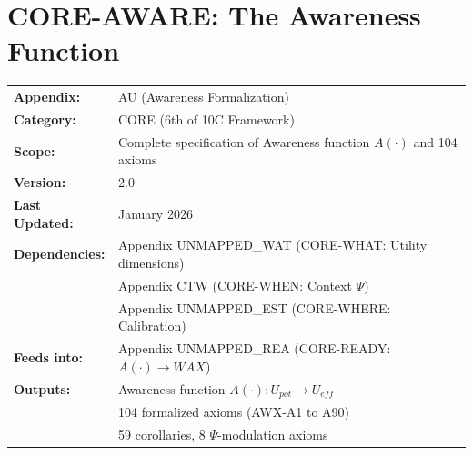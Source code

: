 %

\chapter{CORE-AWARE: The Awareness Function}
\label{app:core-aware}
\label{app:bcm-axiom-formalization}  %


\begin{tcolorbox}[colback=blue!5!white, colframe=blue!75!black,
    title=\textbf{Appendix UNMAPPED_AWA: CORE-AWARE}]

\begin{tabular}{@{}ll@{}}
\textbf{Appendix:} & AU (Awareness Formalization) \\
\textbf{Category:} & CORE (6th of 10C Framework) \\
\textbf{Scope:} & Complete specification of Awareness function $A(\cdot)$ and 104 axioms \\
\textbf{Version:} & 2.0 \\
\textbf{Last Updated:} & January 2026 \\
\textbf{Dependencies:} & Appendix UNMAPPED_WAT (CORE-WHAT: Utility dimensions) \\
                       & Appendix CTW (CORE-WHEN: Context $\Psi$) \\
                       & Appendix UNMAPPED_EST (CORE-WHERE: Calibration) \\
\textbf{Feeds into:}   & Appendix UNMAPPED_REA (CORE-READY: $A(\cdot) \to WAX$) \\
\textbf{Outputs:} & Awareness function $A(\cdot): U_{pot} \to U_{eff}$ \\
                  & 104 formalized axioms (AWX-A1 to A90) \\
                  & 59 corollaries, 8 $\Psi$-modulation axioms \\
\end{tabular}

\end{tcolorbox}

